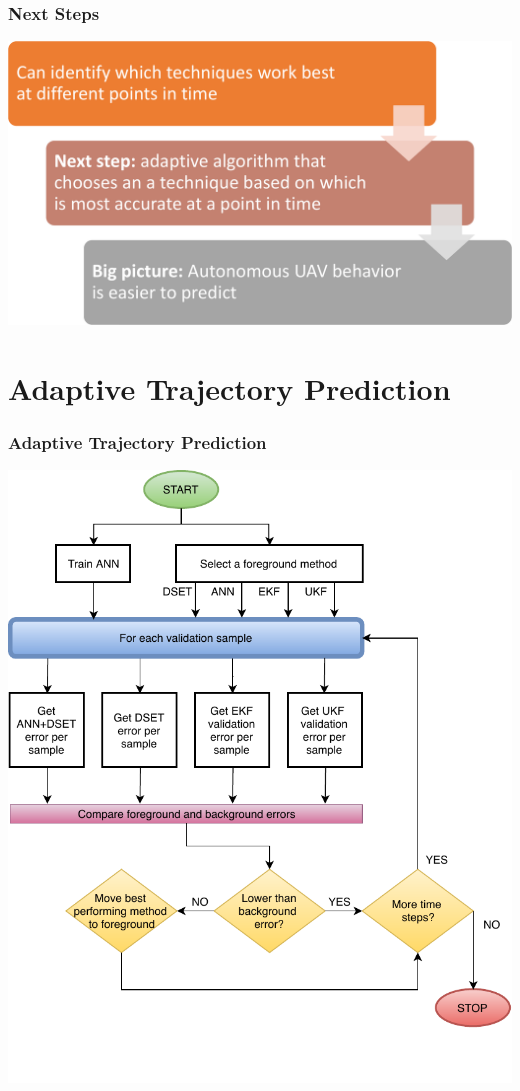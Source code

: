 \documentclass{beamer}
\begin{document}
\begin{frame}
\frametitle{Next Steps}
\includegraphics[width=\textwidth]{next-steps1}
\end{frame}

\section{Adaptive Trajectory Prediction}

\begin{frame}
\frametitle{Adaptive Trajectory Prediction}
\begin{center}
\includegraphics[width=.6\textwidth]{switching1}
\end{center}
\end{frame}
\end{document}
